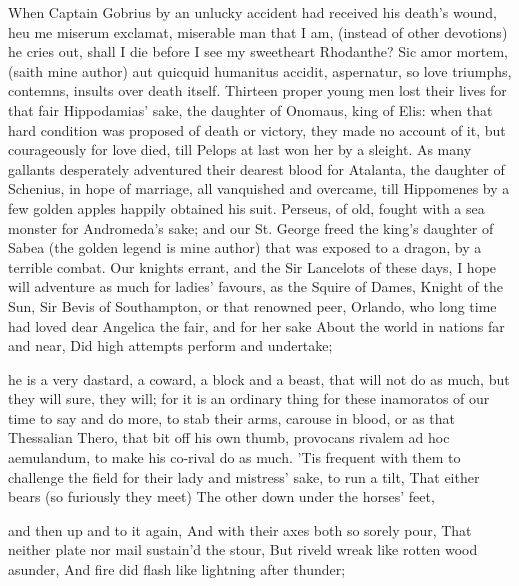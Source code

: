 {When Captain Gobrius by an unlucky accident had received his
death's wound, heu me miserum exclamat, miserable man that I am,
(instead of other devotions) he cries out, shall I die before I see my
sweetheart Rhodanthe? Sic amor mortem, (saith mine author) aut quicquid
humanitus accidit, aspernatur, so love triumphs, contemns, insults over
death itself. Thirteen proper young men lost their lives for that fair
Hippodamias' sake, the daughter of Onomaus, king of Elis: when that
hard condition was proposed of death or victory, they made no account
of it, but courageously for love died, till Pelops at last won her by a
sleight. As many gallants desperately adventured their dearest
blood for Atalanta, the daughter of Schenius, in hope of marriage, all
vanquished and overcame, till Hippomenes by a few golden apples happily
obtained his suit. Perseus, of old, fought with a sea monster for
Andromeda's sake; and our St. George freed the king's daughter of Sabea
(the golden legend is mine author) that was exposed to a dragon, by a
terrible combat. Our knights errant, and the Sir Lancelots of these
days, I hope will adventure as much for ladies' favours, as the Squire
of Dames, Knight of the Sun, Sir Bevis of Southampton, or that renowned
peer,
Orlando, who long time had loved dear
Angelica the fair, and for her sake
About the world in nations far and near,
Did high attempts perform and undertake;

he is a very dastard, a coward, a block and a beast, that will not do
as much, but they will sure, they will; for it is an ordinary thing for
these inamoratos of our time to say and do more, to stab their arms,
carouse in blood, or as that Thessalian Thero, that bit off his
own thumb, provocans rivalem ad hoc aemulandum, to make his co-rival do
as much. 'Tis frequent with them to challenge the field for their lady
and mistress' sake, to run a tilt,
That either bears (so furiously they meet)
The other down under the horses' feet,

and then up and to it again,
And with their axes both so sorely pour,
That neither plate nor mail sustain'd the stour,
But riveld wreak like rotten wood asunder,
And fire did flash like lightning after thunder;

}
